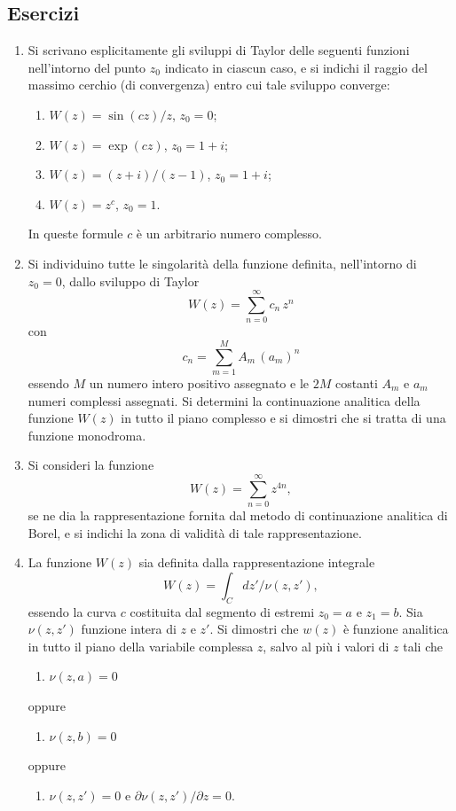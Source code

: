 \documentclass[11pt, a4paper]{book}
\numberwithin{equation}{section}
\newenvironment{esercizi}{\subsection*{Esercizi}\begin{enumerate}}{\end{enumerate}}
\begin{document}
\begin{esercizi}
\item Si scrivano esplicitamente gli sviluppi di Taylor delle seguenti funzioni nell'intorno del punto $z_0$ indicato in ciascun caso, e si indichi il raggio del massimo cerchio (di convergenza) entro cui tale sviluppo converge:
\begin{enumerate}
\item[i)] $W(z) = \sin(cz) / z$, \quad $z_0 = 0$;
\item[ii)] $W(z) = \exp(cz)$, \quad $z_0 = 1+i$;
\item[iii)] $W(z) = (z+i)/(z-1)$, \quad $z_0 = 1+i$;
\item[iv)] $W(z) = z^c$, \quad $z_0 = 1$.
\end{enumerate}
In queste formule $c$ è un arbitrario numero complesso.

\item Si individuino tutte le singolarità della funzione definita, nell'intorno di $z_0 = 0$, dallo sviluppo di Taylor
\[
W(z) = \sum_{n=0}^{\infty} c_n\, z^n
\]
con
\[
c_n = \sum_{m=1}^{M} A_m\,(a_m)^n
\]
essendo $M$ un numero intero positivo assegnato e le $2M$ costanti $A_m$ e $a_m$ numeri complessi assegnati.
Si determini la continuazione analitica della funzione $W(z)$ in tutto il piano complesso e si dimostri che si tratta di una funzione monodroma.

\item Si consideri la funzione
\[
W(z) = \sum_{n=0}^{\infty} z^{4n},
\]
se ne dia la rappresentazione fornita dal metodo di continuazione analitica di Borel, e si indichi la zona di validità di tale rappresentazione.

\item[*] La funzione $W(z)$ sia definita dalla rappresentazione integrale
\[
W(z) = \int_C dz'\big/\nu(z,z'),
\]
essendo la curva $c$ costituita dal segmento di estremi $z_0 = a$ e $z_1 = b$. Sia $\nu(z,z')$ funzione intera di $z$ e $z'$. Si dimostri che $w(z)$ è funzione analitica in tutto il piano della variabile complessa $z$, salvo al più i valori di $z$ tali che
\begin{enumerate}
\item[i)] $\nu(z, a) = 0$
\end{enumerate}
oppure
\begin{enumerate}
\item[ii)] $\nu(z, b) = 0$
\end{enumerate}
oppure
\begin{enumerate}
\item[iii)] $\nu(z, z') = 0$ \quad e \quad $\partial\nu(z,z')/\partial z = 0$.
\end{enumerate}
\end{esercizi}
\end{document}
